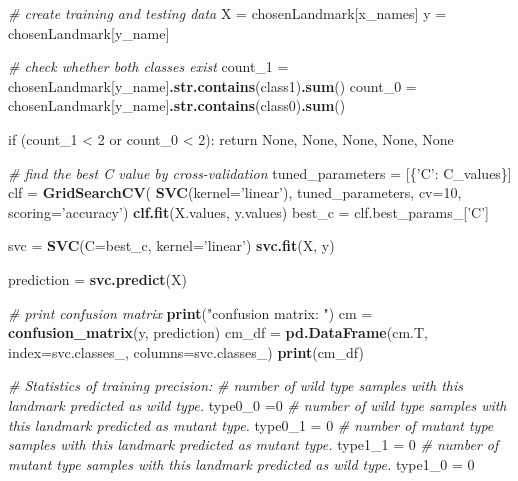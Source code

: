 \documentclass[10pt,letterpaper]{article}
\newenvironment{Shaded}{\begin{snugshade}}{\end{snugshade}}
\newcommand{\KeywordTok}[1]{\textcolor[rgb]{0.13,0.29,0.53}{\textbf{#1}}}
\newcommand{\DataTypeTok}[1]{\textcolor[rgb]{0.13,0.29,0.53}{#1}}
\newcommand{\DecValTok}[1]{\textcolor[rgb]{0.00,0.00,0.81}{#1}}
\newcommand{\StringTok}[1]{\textcolor[rgb]{0.31,0.60,0.02}{#1}}
\newcommand{\CommentTok}[1]{\textcolor[rgb]{0.56,0.35,0.01}{\textit{#1}}}
\newcommand{\NormalTok}[1]{#1}
\begin{document}
\begin{Shaded}
\begin{Highlighting}[]
    \CommentTok{# create training and testing data}
    \NormalTok{X =}\StringTok{ }\NormalTok{chosenLandmark[x_names]}
    \NormalTok{y =}\StringTok{ }\NormalTok{chosenLandmark[y_name]}

    \CommentTok{# check whether both classes exist}
    \NormalTok{count_1 =}\StringTok{ }\NormalTok{chosenLandmark[y_name]}\KeywordTok{.str.contains}\NormalTok{(class1)}\KeywordTok{.sum}\NormalTok{()}
    \NormalTok{count_0 =}\StringTok{ }\NormalTok{chosenLandmark[y_name]}\KeywordTok{.str.contains}\NormalTok{(class0)}\KeywordTok{.sum}\NormalTok{()}

    \NormalTok{if (count_1 <}\StringTok{ }\DecValTok{2} \NormalTok{or count_0 <}\StringTok{ }\DecValTok{2}\NormalTok{):}
\StringTok{        }\NormalTok{return None, None, None, None, None}

    \CommentTok{# find the best C value by cross-validation}
    \NormalTok{tuned_parameters =}\StringTok{ }\NormalTok{[\{}\StringTok{'C'}\NormalTok{:}\StringTok{ }\NormalTok{C_values\}]}
    \NormalTok{clf =}\StringTok{ }\KeywordTok{GridSearchCV}\NormalTok{(}
        \KeywordTok{SVC}\NormalTok{(}\DataTypeTok{kernel=}\StringTok{'linear'}\NormalTok{), tuned_parameters, }\DataTypeTok{cv=}\DecValTok{10}\NormalTok{, }\DataTypeTok{scoring=}\StringTok{'accuracy'}\NormalTok{)}
    \KeywordTok{clf.fit}\NormalTok{(X.values, y.values)}
    \NormalTok{best_c =}\StringTok{ }\NormalTok{clf.best_params_[}\StringTok{'C'}\NormalTok{]}
    
    \NormalTok{svc =}\StringTok{ }\KeywordTok{SVC}\NormalTok{(}\DataTypeTok{C=}\NormalTok{best_c, }\DataTypeTok{kernel=}\StringTok{'linear'}\NormalTok{)}
    \KeywordTok{svc.fit}\NormalTok{(X, y)}
    
    \NormalTok{prediction =}\StringTok{ }\KeywordTok{svc.predict}\NormalTok{(X)}

    \CommentTok{# print confusion matrix}
    \KeywordTok{print}\NormalTok{(}\StringTok{"confusion matrix: "}\NormalTok{)}
    \NormalTok{cm =}\StringTok{ }\KeywordTok{confusion_matrix}\NormalTok{(y, prediction)}
    \NormalTok{cm_df =}\StringTok{ }\KeywordTok{pd.DataFrame}\NormalTok{(cm.T, }\DataTypeTok{index=}\NormalTok{svc.classes_, }\DataTypeTok{columns=}\NormalTok{svc.classes_)}
    \KeywordTok{print}\NormalTok{(cm_df)}

    \CommentTok{# Statistics of training precision:}
    \CommentTok{# number of wild type samples with this landmark predicted as wild type.}
    \NormalTok{type0_0 =}\DecValTok{0}
    \CommentTok{# number of wild type samples with this landmark predicted as mutant type.}
    \NormalTok{type0_1 =}\StringTok{ }\DecValTok{0}
    \CommentTok{# number of mutant type samples with this landmark predicted as mutant type.}
    \NormalTok{type1_1 =}\StringTok{ }\DecValTok{0}
    \CommentTok{# number of mutant type samples with this landmark predicted as wild type.}
    \NormalTok{type1_0 =}\StringTok{ }\DecValTok{0}
    

\end{Highlighting}
\end{Shaded}
\end{document}

